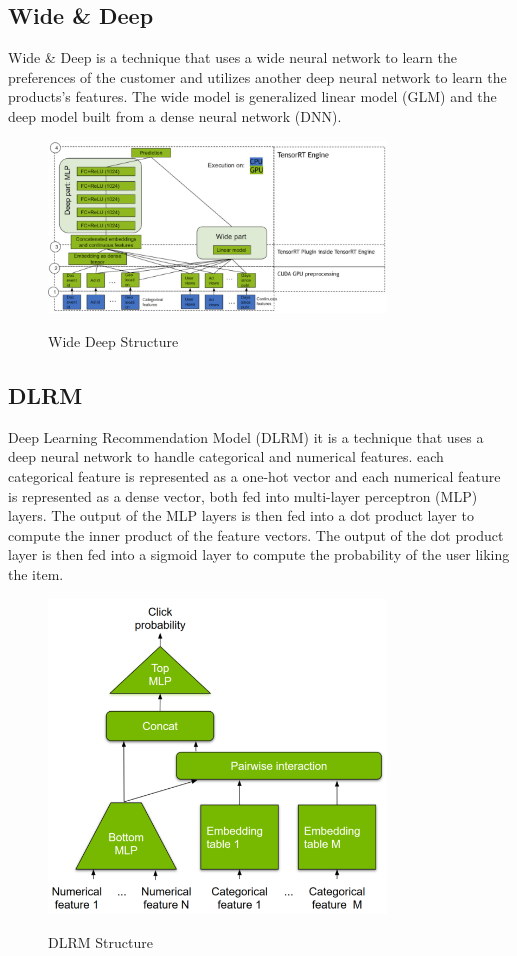 \subsection{Wide \& Deep}
Wide \& Deep is a technique that uses a wide neural network to learn the preferences of the customer and utilizes another deep neural network to learn the products's features. The wide model is generalized linear model (GLM) and the deep model built from a dense neural network (DNN).
\begin{figure}[H]
    \centering
    \includegraphics[width=0.8\textwidth]{assets/wide_deep.png}
    \caption{Wide Deep Structure}
    \label{fig:wide-deep}
    \cite{NvidiaRecSys}
\end{figure}

\subsection{DLRM}
Deep Learning Recommendation Model (DLRM) it is a technique that uses a deep neural network to handle categorical and numerical features. each categorical feature is represented as a one-hot vector and each numerical feature is represented as a dense vector, both fed into multi-layer perceptron (MLP) layers. The output of the MLP layers is then fed into a dot product layer to compute the inner product of the feature vectors. The output of the dot product layer is then fed into a sigmoid layer to compute the probability of the user liking the item.
\begin{figure}[H]
    \centering
    \includegraphics[width=0.8\textwidth]{assets/dlrm.png}
    \caption{DLRM Structure}
    \label{fig:dlrm}
    \cite{NvidiaRecSys}
\end{figure}
